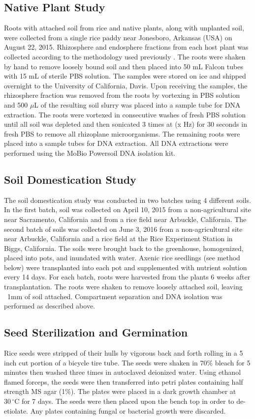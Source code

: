 \subsection{Native Plant Study}
Roots with attached soil from rice and native plants, along with unplanted soil, were collected from a single rice paddy near Jonesboro, Arkansas (USA) on August 22, 2015. Rhizosphere and endosphere fractions from each host plant was collected according to the methodology used previously \cite{Edwards2015}. The roots were shaken by hand to remove loosely bound soil and then placed into 50 mL Falcon tubes with 15 mL of sterile PBS solution. The samples were stored on ice and shipped overnight to the University of California, Davis. Upon receiving the samples, the rhizosphere fraction was removed from the roots by vortexing in PBS solution and 500 $\mu$L of the resulting soil slurry was placed into a sample tube for DNA extraction. The roots were vortexed in consecutive washes of fresh PBS solution until all soil was depleted and then sonicated 3 times at (x Hz) for 30 seconds in fresh PBS to remove all rhizoplane microorganisms. The remaining roots were placed into a sample tubes for DNA extraction. All DNA extractions were performed using the MoBio Powersoil DNA isolation kit. 

\subsection{Soil Domestication Study}
The soil domestication study was conducted in two batches using 4 different soils. In the first batch, soil was collected on April 10, 2015 from a non-agricultural site near Sacramento, California and from a rice field near Arbuckle, California. The second batch of soils was collected on June 3, 2016 from a non-agricultural site near Arbuckle, California and a rice field at the Rice Experiment Station in Biggs, California. The soils were brought back to the greenhouse, homogenized, placed into pots, and inundated with water. Axenic rice seedlings (see method below) were transplanted into each pot and supplemented with nutrient solution every 14 days. For each batch, roots were harvested from the plants 6 weeks after transplantation. The roots were shaken to remove loosely attached soil, leaving ~1mm of soil attached. Compartment separation and DNA isolation was performed as described above.

\subsection{Seed Sterilization and Germination }
Rice seeds were stripped of their hulls by vigorous back and forth rolling in a 5 inch cut portion of a bicycle tire tube. The seeds were shaken in 70\% bleach for 5 minutes then washed three times in autoclaved deionized water. Using ethanol flamed forceps, the seeds were then transferred into petri plates containing half strength MS agar (1\%). The plates were placed in a dark growth chamber at $30\,^{\circ}\mathrm{C}$ for 7 days. The seeds were then placed upon the bench top in order to de-etiolate. Any plates containing fungal or bacterial growth were discarded.


